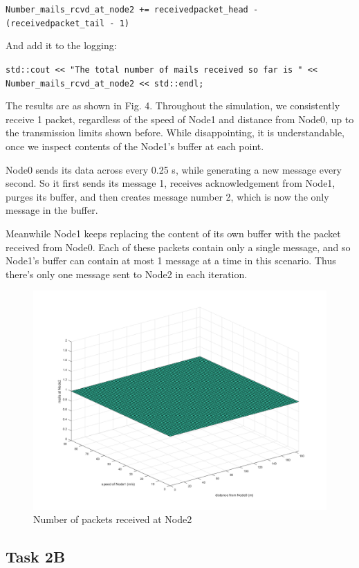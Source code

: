 \documentclass[11pt,journal]{article}
\begin{document}
	\texttt{Number\_mails\_rcvd\_at\_node2 += receivedpacket\_head - (receivedpacket\_tail - 1)} 
	
	And add it to the logging: 
	
	\texttt{std::cout << "The total number of mails received so far is " << Number\_mails\_rcvd\_at\_node2 << std::endl;}
	
	The results are as shown in Fig. 4. Throughout the simulation, we consistently receive 1 packet, regardless of the speed of Node1 and distance from Node0, up to the transmission limits shown before. While disappointing, it is understandable, once we inspect contents of the Node1's buffer at each point. 
	
	Node0 sends its data across every 0.25 s, while generating a new message every second. So it first sends its message 1, receives acknowledgement from Node1, purges its buffer, and then creates message number 2, which is now the only message in the buffer.
	
	Meanwhile Node1 keeps replacing the content of its own buffer with the packet received from Node0. Each of these packets contain only a single message, and so Node1's buffer can contain at most 1 message at a time in this scenario. Thus there's only one message sent to Node2 in each iteration.
	
	\begin{figure}[h]
		\centering
		\includegraphics[scale=0.4]{graph2a.png}
		\caption{Number of packets received at Node2}
	\end{figure}
	\pagebreak
	\subsection{Task 2B}
	
\end{document}
